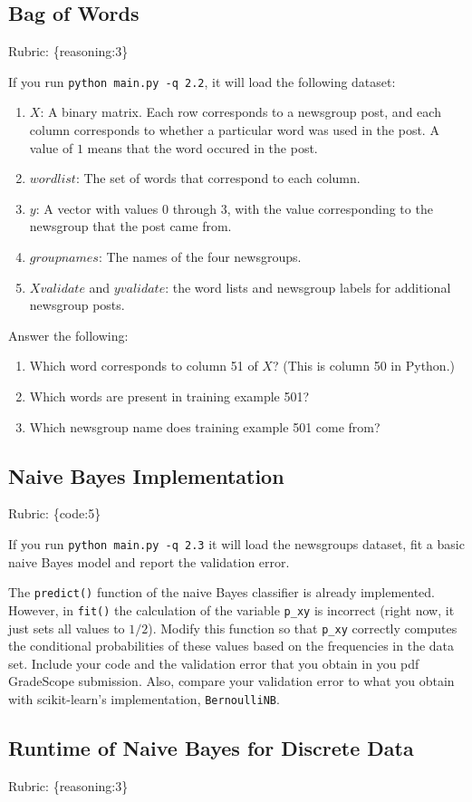 \documentclass{article}
\def\rubric#1{\gre{Rubric: \{#1\}}}{}
\def\blu#1{{\color{blu}#1}}
\def\gre#1{{\color{gre}#1}}
\def\enum#1{\begin{enumerate}#1\end{enumerate}}
\begin{document}
\subsection{Bag of Words}
\rubric{reasoning:3}

If you run \texttt{python main.py -q 2.2}, it will load the following dataset:
\enum{
\item $X$: A binary matrix. Each row corresponds to a newsgroup post, and each column corresponds to whether a particular word was used in the post. A value of $1$ means that the word occured in the post.
\item $wordlist$: The set of words that correspond to each column.
\item $y$: A vector with values $0$ through $3$, with the value corresponding to the newsgroup that the post came from.
\item $groupnames$: The names of the four newsgroups.
\item $Xvalidate$ and $yvalidate$: the word lists and newsgroup labels for additional newsgroup posts.
}
\blu{Answer the following}:
\enum{
\item Which word corresponds to column 51 of $X$? (This is column 50 in Python.)
\item Which words are present in training example 501?
\item Which newsgroup name does training example 501 come from?
}

\subsection{Naive Bayes Implementation}
\rubric{code:5}

If you run \texttt{python main.py -q 2.3}
it will load the newsgroups dataset, fit a basic naive Bayes model and report the validation error.

The \texttt{predict()} function of the naive Bayes classifier is already implemented.
However, in \texttt{fit()}
the calculation of the variable \texttt{p\_xy} is incorrect
(right now, it just sets all values to $1/2$).
\blu{Modify this function so that \texttt{p\_xy} correctly
computes the conditional probabilities of these values based on the
frequencies in the data set. Include your code and the validation error that you obtain in you pdf GradeScope submission.
Also, compare your validation error to what you obtain with scikit-learn's implementation, \texttt{BernoulliNB}.}


\subsection{Runtime of Naive Bayes for Discrete Data}
\rubric{reasoning:3}
\end{document}
